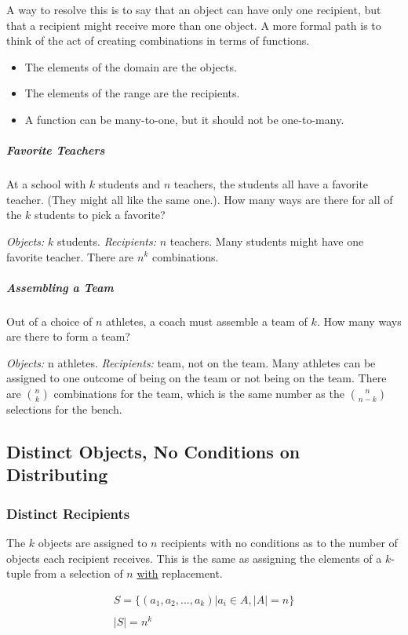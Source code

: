 A way to resolve this is to say that an object can have only one recipient, but that a recipient might receive more than one object. A more formal path is to think of the act of creating combinations in terms of functions. 

\begin{itemize}
\item The elements of the domain are the objects. 
\item The elements of the range are the recipients. 
\item A function can be many-to-one, but it should not be one-to-many. 
\end{itemize}

\subparagraph{Favorite Teachers} At a school with $k$ students and $n$ teachers, the students all have a favorite teacher. (They might all like the same one.). How many ways are there for all of the $k$ students to pick a favorite? 

\textit{Objects:} $k$ students. \textit{Recipients:} $n$ teachers. Many students might have one favorite teacher. There are $n^k$ combinations. 

\subparagraph{Assembling a Team} Out of a choice of $n$ athletes, a coach must assemble a team of $k$. How many ways are there to form a team? 

\textit{Objects:} n athletes. \textit{Recipients:} team, not on the team. Many athletes can be assigned to one outcome of being on the team or not being on the team. There are ${n \choose k}$ combinations for the team, which is the same number as the ${n \choose n-k}$ selections for the bench. 


\subsection{Distinct Objects, No Conditions on Distributing}


\subsubsection{Distinct Recipients}
The $k$ objects are assigned to $n$ recipients with no conditions as to the number of objects each recipient receives. This is the same as assigning the elements of a $k$-tuple from a selection of $n$ \underline{with} replacement.

\begin{equation}	
\begin{array}{l}
S = \{ (a_1,a_2,...,a_k) | a_i \in A, |A| = n \}\\
\\
|S| = n^k
\end{array}
\end{equation}



